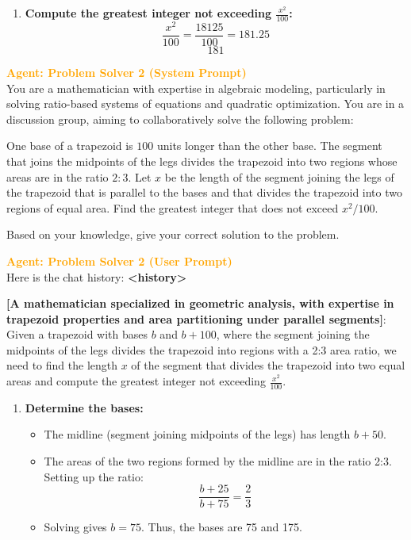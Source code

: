 \begin{tcolorbox}[
  title=Multiagent Collaborative Reasoning Trace Data Sample,
  breakable,
  colback=white,
  colframe=black
]
\begin{enumerate}
  \item \textbf{Compute the greatest integer not exceeding \( \frac{x^2}{100} \):}
    \[
    \frac{x^2}{100} = \frac{18125}{100} = 181.25
    \]
    \[
    \boxed{181}
    \]
\end{enumerate}

\textcolor{orange}{\textbf{Agent: Problem Solver 2 (System Prompt)}} \\
You are a mathematician with expertise in algebraic modeling, particularly in solving ratio-based systems of equations and quadratic optimization. You are in a discussion group, aiming to collaboratively solve the following problem:

One base of a trapezoid is $100$ units longer than the other base. The segment that joins the midpoints of the legs divides the trapezoid into two regions whose areas are in the ratio $2:3$. Let $x$ be the length of the segment joining the legs of the trapezoid that is parallel to the bases and that divides the trapezoid into two regions of equal area. Find the greatest integer that does not exceed $x^2/100$.

Based on your knowledge, give your correct solution to the problem.

\textcolor{orange}{\textbf{Agent: Problem Solver 2 (User Prompt)}} \\
Here is the chat history:
\textbf{\textless history\textgreater}

\textbf{[A mathematician specialized in geometric analysis, with expertise in trapezoid properties and area partitioning under parallel segments]}: Given a trapezoid with bases \( b \) and \( b + 100 \), where the segment joining the midpoints of the legs divides the trapezoid into regions with a 2:3 area ratio, we need to find the length \( x \) of the segment that divides the trapezoid into two equal areas and compute the greatest integer not exceeding \( \frac{x^2}{100} \).

\begin{enumerate}
  \item \textbf{Determine the bases:}
  \begin{itemize}
    \item The midline (segment joining midpoints of the legs) has length \( b + 50 \).
    \item The areas of the two regions formed by the midline are in the ratio 2:3. Setting up the ratio:
    \[
    \frac{b + 25}{b + 75} = \frac{2}{3}
    \]
    \item Solving gives \( b = 75 \). Thus, the bases are 75 and 175.
  \end{itemize}


\end{enumerate}
\end{tcolorbox}
